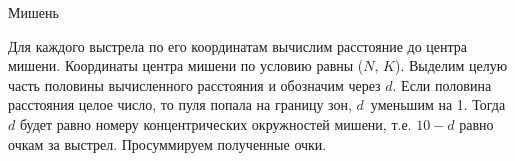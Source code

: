 \begin{tutorial}{Мишень}

Для каждого выстрела по его координатам вычислим расстояние до центра мишени. Координаты центра мишени по условию равны ($N$, $K$). Выделим целую часть половины вычисленного расстояния и обозначим через $d$. Если половина расстояния целое число, то пуля попала на границу зон, $d$~уменьшим на 1. Тогда $d$ будет равно номеру концентрических окружностей мишени, т.е. $10-d$ равно очкам за выстрел. Просуммируем полученные очки.


\end{tutorial}
